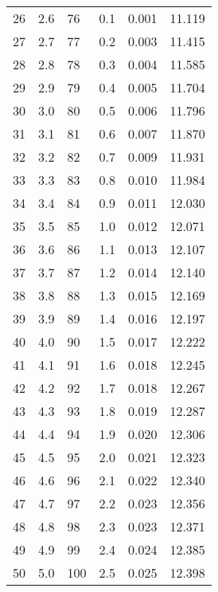 \documentclass{article}
\begin{document}
\begin{table}
\begin{tabular}{llllll}
    \hline
26 & 2.6 & 76 & 0.1 & 0.001 & 11.119\\
27 & 2.7 & 77 & 0.2 & 0.003 & 11.415\\
28 & 2.8 & 78 & 0.3 & 0.004 & 11.585\\
29 & 2.9 & 79 & 0.4 & 0.005 & 11.704\\
30 & 3.0 & 80 & 0.5 & 0.006 & 11.796\\
31 & 3.1 & 81 & 0.6 & 0.007 & 11.870\\
32 & 3.2 & 82 & 0.7 & 0.009 & 11.931\\
33 & 3.3 & 83 & 0.8 & 0.010 & 11.984\\
34 & 3.4 & 84 & 0.9 & 0.011 & 12.030\\
35 & 3.5 & 85 & 1.0 & 0.012 & 12.071\\
36 & 3.6 & 86 & 1.1 & 0.013 & 12.107\\
37 & 3.7 & 87 & 1.2 & 0.014 & 12.140\\
38 & 3.8 & 88 & 1.3 & 0.015 & 12.169\\
39 & 3.9 & 89 & 1.4 & 0.016 & 12.197\\
40 & 4.0 & 90 & 1.5 & 0.017 & 12.222\\
41 & 4.1 & 91 & 1.6 & 0.018 & 12.245\\
42 & 4.2 & 92 & 1.7 & 0.018 & 12.267\\
43 & 4.3 & 93 & 1.8 & 0.019 & 12.287\\
44 & 4.4 & 94 & 1.9 & 0.020 & 12.306\\
45 & 4.5 & 95 & 2.0 & 0.021 & 12.323\\
46 & 4.6 & 96 & 2.1 & 0.022 & 12.340\\
47 & 4.7 & 97 & 2.2 & 0.023 & 12.356\\
48 & 4.8 & 98 & 2.3 & 0.023 & 12.371\\
49 & 4.9 & 99 & 2.4 & 0.024 & 12.385\\
50 & 5.0 & 100 & 2.5 & 0.025 & 12.398\\
  \end{tabular}
\end{table}
\end{document}
